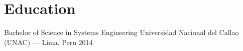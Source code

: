
\section{Education}

\cvEduEntry%
  {Bachelor of Science in Systems Engineering}%
  {Universidad Nacional del Callao (UNAC) --- Lima, Peru}%
  {2014}
